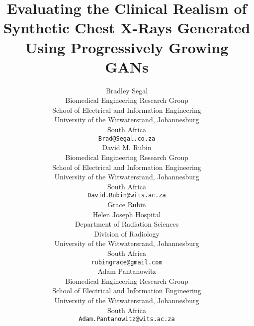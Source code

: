 \documentclass{article}
\begin{document}
\title{Evaluating the Clinical Realism of Synthetic Chest X-Rays Generated Using Progressively Growing GANs}

\author{
  Bradley Segal\\
  Biomedical Engineering Research Group\\
  School of Electrical and Information Engineering\\
  University of the Witwatersrand, Johannesburg\\
  South Africa \\
  \texttt{Brad@Segal.co.za} \\

   \And
  David M. Rubin \\
  Biomedical Engineering Research Group\\
  School of Electrical and Information Engineering\\
  University of the Witwatersrand, Johannesburg\\
  South Africa \\
  \texttt{David.Rubin@wits.ac.za} \\
  
   \And
  Grace Rubin \\
  Helen Joseph Hospital\\
  Department of Radiation Sciences\\
  Division of Radiology\\
  University of the Witwatersrand, Johannesburg\\
  South Africa \\
  \texttt{rubingrace@gmail.com} \\
  
  \And
  Adam Pantanowitz \\
  Biomedical Engineering Research Group\\
  School of Electrical and Information Engineering\\
  University of the Witwatersrand, Johannesburg\\
  South Africa \\
  \texttt{Adam.Pantanowitz@wits.ac.za} \\
}

\maketitle
\end{document}
